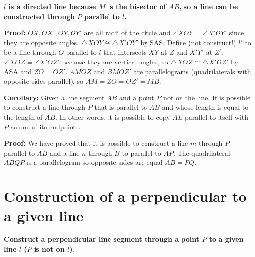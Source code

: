 \textbf{$l$ is a directed line because $M$ is the bisector of $AB$, so a line can be constructed through $P$ parallel to $l$.}

\textbf{Proof:} $OX,OX',OY,OY'$ are all radii of the circle and $\angle XOY = \angle X'OY'$ since they are opposite angles. $\triangle XOY\cong\triangle X'OY'$ by SAS. Define (not construct!) $l'$ to be a line through $O$ parallel to $l$ that intersects $XY$ at $Z$ and $X'Y'$ at $Z'$. $\angle XOZ=\angle X'OZ'$ because they are vertical angles, so $\triangle XOZ\cong\triangle X'OZ'$ by ASA and $ZO=OZ'$. $AMOZ$ and $BMOZ'$ are parallelograms (quadrilaterals with opposite sides parallel), so $AM=ZO=OZ'=MB$.

\textbf{Corollary:} Given a line segment $AB$ and a point $P$ not on the line. It is possible to construct a line through $P$ that is parallel to $AB$ and whose length is equal to the length of $AB$. In other words, it is possible to copy $AB$ parallel to itself with $P$ as one of its endpoints.

\textbf{Proof:} We have proved that it is possible to construct a line $m$ through $P$ parallel to $AB$ and a line $n$ through $B$ to parallel to $AP$. The quadrilateral $ABQP$ is a parallelogram so opposite sides are equal $AB=PQ$.
\begin{center}
\end{center}

\section{Construction of a perpendicular to a given line}\label{s.perp}

\textbf{Construct a perpendicular line segment through a point $P$ to a given line $l$ ($P$ is not on $l$).}

